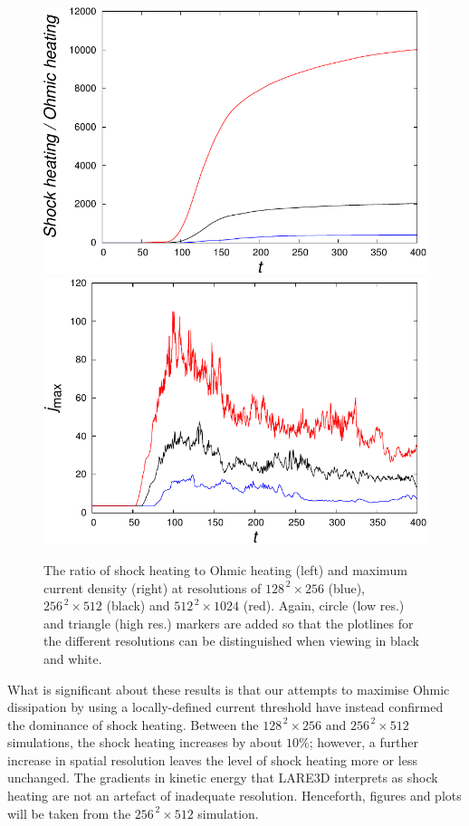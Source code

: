 \documentclass{./packages/rs/rsproca}
\begin{document}
\begin{figure}[h!]
  \center  
  \includegraphics[scale=0.52]{./gnuplot/ht_visc_ohmic}
  \includegraphics[scale=0.52]{./gnuplot/j_max}
  \caption{\small{The ratio of shock heating to Ohmic heating (left) and maximum current density (right) at resolutions of $128^{\,2} \times 256$ (blue), $256^{\,2} \times 512$ (black) and $512^{\,2} \times 1024$ (red). Again, circle (low res.) and triangle (high res.) markers are added so that the plotlines for the different resolutions can be distinguished when viewing in black and white.}}
  \label{ht_visc_ohmic}
\end{figure}

What is significant about these results is that our attempts to maximise Ohmic dissipation by using a locally-defined current threshold have instead confirmed the dominance of shock heating. Between the $128^{\,2} \times 256$ and $256^{\,2} \times 512$ simulations, the shock heating increases by about $10\%$; however, a further increase in spatial resolution leaves the level of shock heating more or less unchanged. The gradients in kinetic energy that LARE3D interprets as shock heating are not an artefact of inadequate resolution. Henceforth, figures and plots will be taken from the $256^{\,2} \times 512$ simulation.
\end{document}
